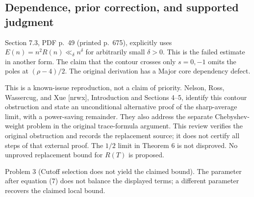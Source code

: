 \documentclass[10pt]{article}
\begin{document}
\subsection*{Dependence, prior correction, and supported judgment}
Section 7.3, PDF p. 49 (printed p. 675), explicitly uses \(E(n)=n^2R(n)\ll_\delta n^\delta\) for arbitrarily small \(\delta>0\). This is the failed estimate in another form. The claim that the contour crosses only \(s=0,-1\) omits the poles at \((\rho-4)/2\). The original derivation has a Major core dependency defect.\par
This is a known-issue reproduction, not a claim of priority. Nelson, Ross, Wassercug, and Xue [nrwx], Introduction and Sections 4–5, identify this contour obstruction and state an unconditional alternative proof of the sharp-average limit, with a power-saving remainder. They also address the separate Chebyshev-weight problem in the original trace-formula argument. This review verifies the original obstruction and records the replacement source; it does not certify all steps of that external proof. The \(1/2\) limit in Theorem 6 is not disproved. No unproved replacement bound for \(R(T)\) is proposed.\par
Problem 3 (Cutoff selection does not yield the claimed bound).  The parameter after equation (7) does not balance the displayed terms; a different parameter recovers the claimed local bound.\par
\end{document}
